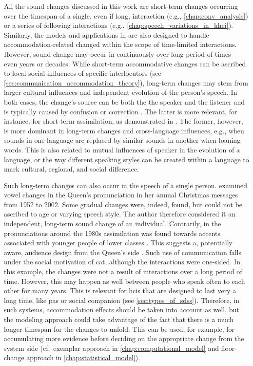 All the sound changes discussed in this work are short-term changes occurring over the timespan of a single, even if long, interaction (e.g., \cref{chap:conv_analysis}) or a series of following interactions (e.g., \cref{chap:speech_variations_in_hhci}).
Similarly, the models and applications in  are also designed to handle accommodation-related changed within the scope of time-limited interactions.
However, sound change may occur in continuously over long period of times -- even years or decades.
While short-term accommodative changes can be ascribed to local social influences of specific interlocutors (see \cref{sec:communication_accommodation_theory}), long-term changes may stem from larger cultural influences and independent evolution of the person's speech.
In both cases, the change's source can be both the the speaker and the listener \citep[][pp.\ 176-187]{Ohala1989sound} and is typically caused by confusion or correction \citep{Ohala1993phonetics}.
The latter is more relevant, for instance, for short-term assimilation, as demonstrated in \citet{Ohala1990phonetics}.
The former, however, is more dominant in long-term changes and cross-language influences, e.g., when sounds in one language are replaced by similar sounds in another when loaning words.
This is also related to mutual influences of speaker in the evolution of a language, or the way different speaking styles can be created within a language to mark cultural, regional, and social difference.

Such long-term changes can also occur in the speech of a single person.
\citet{Harrington2007evidence} examined vowel changes in the Queen's pronunciation in her annual Christmas messages from 1952 to 2002.
Some gradual changes were, indeed, found, but could not be ascribed to age or varying speech style.
The author therefore considered it an independent, long-term sound change of an individual.
Contrarily, in the pronunciations around the 1980s assimilation was found towards accents associated with younger people of lower classes \citep{Harrington2000does, Harrington2000monophthongal}.
This suggests a, potentially aware, audience design from the Queen's side \citep{Bell1984language}.
Such use of communication falls under the social motivation of \ac{cat}, although the interactions were one-sided.
In this example, the changes were not a result of interactions over a long period of time.
However, this may happen as well between people who speak often to each other for many years.
This is relevant for \acp{hci} that are designed to last very a long time, like \acp{pa} or social companion (see \cref{sec:types_of_sdss}).
Therefore, in such systems, accommodation effects should be taken into account as well, but the modeling approach could take advantage of the fact that there is a much longer timespan for the changes to unfold.
This can be used, for example, for accumulating more evidence before deciding on the appropriate change from the system side (cf.\ exemplar approach in \cref{chap:computational_model} and floor-change approach in \cref{chap:statistical_model}).

